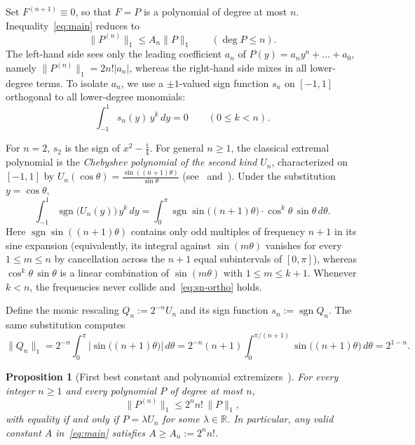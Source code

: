 \documentclass[11pt,a4paper]{article}
\newcommand{\R}{\mathbb{R}}
\newcommand{\sgn}{\operatorname{sgn}}
\newcommand{\Lone}[1]{\lVert #1\rVert_1}
\newtheorem{proposition}{Proposition}[section]
\theoremstyle{remark}
\numberwithin{equation}{section}
\begin{document}
Set $F^{(n+1)} \equiv 0$, so that $F = P$ is a polynomial of degree at most $n$. Inequality~\eqref{eq:main} reduces to
\begin{equation}
    \Lone{P^{(n)}} \le A_n \Lone{P} \qquad (\deg P \le n).
    \label{eq:poly-ineq}
\end{equation}
The left-hand side sees only the leading coefficient $a_n$ of $P(y) = a_n y^n + \dots + a_0$, namely $\Lone{P^{(n)}} = 2n!|a_n|$, whereas the right-hand side mixes in all lower-degree terms. To isolate $a_n$, we use a $\pm 1$-valued sign function $s_n$ on $[-1,1]$ orthogonal to all lower-degree monomials:
\begin{equation}
    \int_{-1}^{1} s_n(y)\,y^k\,dy = 0 \qquad (0 \le k < n).
    \label{eq:sn-ortho}
\end{equation}

For $n = 2$, $s_2$ is the sign of $x^2 - \frac14$. For general $n \ge 1$, the classical extremal polynomial is the \emph{Chebyshev polynomial of the second kind} $U_n$, characterized on $[-1,1]$ by $U_n(\cos\theta) = \frac{\sin((n+1)\theta)}{\sin\theta}$ (see~\cite[\S4$^\circ$]{Burenkov1980} and~\cite{Pinkus1989}). Under the substitution $y = \cos\theta$,
\[
    \int_{-1}^{1} \sgn\bigl(U_n(y)\bigr)\,y^k\,dy
    = \int_0^\pi \sgn\sin\bigl((n+1)\theta\bigr)\cdot \cos^k\theta\,\sin\theta\,d\theta.
\]
Here $\sgn\sin((n+1)\theta)$ contains only odd multiples of frequency $n+1$ in its sine expansion (equivalently, its integral against $\sin(m\theta)$ vanishes for every $1 \le m \le n$ by cancellation across the $n+1$ equal subintervals of $[0,\pi]$), whereas $\cos^k\theta\,\sin\theta$ is a linear combination of $\sin(m\theta)$ with $1 \le m \le k+1$. Whenever $k < n$, the frequencies never collide and~\eqref{eq:sn-ortho} holds.

Define the monic rescaling $Q_n := 2^{-n} U_n$ and its sign function $s_n := \sgn Q_n$. The same substitution computes
\[
    \Lone{Q_n}
    = 2^{-n}\int_0^\pi \bigl|\sin\bigl((n+1)\theta\bigr)\bigr|\,d\theta
    = 2^{-n}(n+1)\int_0^{\pi/(n+1)} \sin\bigl((n+1)\theta\bigr)\,d\theta
    = 2^{1-n}.
\]

\begin{proposition}[First best constant and polynomial extremizers~{\cite[\S4$^\circ$]{Burenkov1980}}]
    \label{prop:An}
    For every integer $n \ge 1$ and every polynomial $P$ of degree at most $n$,
    \[
        \Lone{P^{(n)}} \le 2^n n!\,\Lone{P},
    \]
    with equality if and only if $P = \lambda U_n$ for some $\lambda \in \R$. In particular, any valid constant $A$ in~\eqref{eq:main} satisfies $A \ge A_n := 2^n n!$.
\end{proposition}
\end{document}
